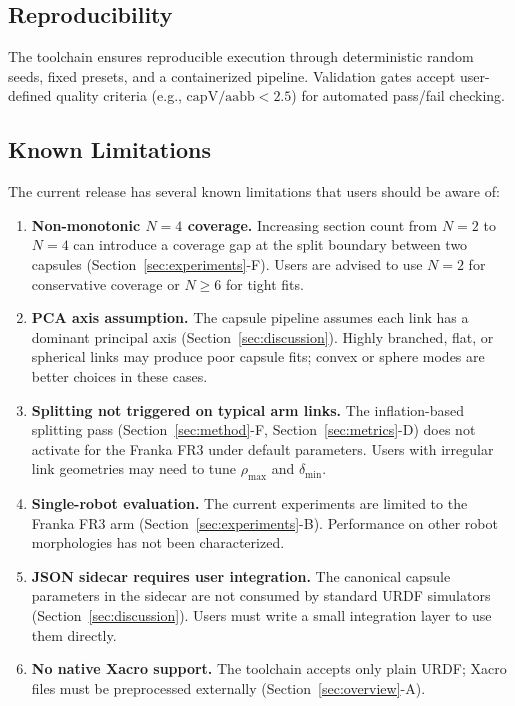 \subsection{Reproducibility}

The toolchain ensures reproducible execution through deterministic random seeds, fixed presets, and a containerized pipeline. Validation gates accept user-defined quality criteria (e.g., $\mathrm{capV/aabb} < 2.5$) for automated pass/fail checking.

\subsection{Known Limitations}

The current release has several known limitations that users should be aware of:

\begin{enumerate}
    \item \textbf{Non-monotonic $N=4$ coverage.} Increasing section count from $N=2$ to $N=4$ can introduce a coverage gap at the split boundary between two capsules (Section~\ref{sec:experiments}-F). Users are advised to use $N=2$ for conservative coverage or $N \geq 6$ for tight fits.

    \item \textbf{PCA axis assumption.} The capsule pipeline assumes each link has a dominant principal axis (Section~\ref{sec:discussion}). Highly branched, flat, or spherical links may produce poor capsule fits; convex or sphere modes are better choices in these cases.

    \item \textbf{Splitting not triggered on typical arm links.} The inflation-based splitting pass (Section~\ref{sec:method}-F, Section~\ref{sec:metrics}-D) does not activate for the Franka FR3 under default parameters. Users with irregular link geometries may need to tune $\rho_{\max}$ and $\delta_{\min}$.

    \item \textbf{Single-robot evaluation.} The current experiments are limited to the Franka FR3 arm (Section~\ref{sec:experiments}-B). Performance on other robot morphologies has not been characterized.

    \item \textbf{JSON sidecar requires user integration.} The canonical capsule parameters in the sidecar are not consumed by standard URDF simulators (Section~\ref{sec:discussion}). Users must write a small integration layer to use them directly.

    \item \textbf{No native Xacro support.} The toolchain accepts only plain URDF; Xacro files must be preprocessed externally (Section~\ref{sec:overview}-A).
\end{enumerate}
